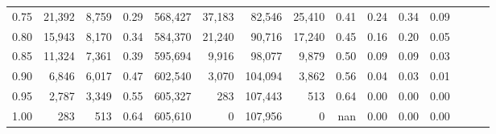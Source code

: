 \begin{tabular}{rrrrrrrrrrrrrrr}
0.75 &  21,392 &  8,759 &  0.29 &  568,427 &   37,183 &   82,546 &   25,410 &  0.41 &  0.24 &  0.34 &      0.09 \\
0.80 &  15,943 &  8,170 &  0.34 &  584,370 &   21,240 &   90,716 &   17,240 &  0.45 &  0.16 &  0.20 &      0.05 \\
0.85 &  11,324 &  7,361 &  0.39 &  595,694 &    9,916 &   98,077 &    9,879 &  0.50 &  0.09 &  0.09 &      0.03 \\
0.90 &   6,846 &  6,017 &  0.47 &  602,540 &    3,070 &  104,094 &    3,862 &  0.56 &  0.04 &  0.03 &      0.01 \\
0.95 &   2,787 &  3,349 &  0.55 &  605,327 &      283 &  107,443 &      513 &  0.64 &  0.00 &  0.00 &      0.00 \\
1.00 &     283 &    513 &  0.64 &  605,610 &        0 &  107,956 &        0 &   nan &  0.00 &  0.00 &      0.00 \\
\bottomrule
\end{tabular}
